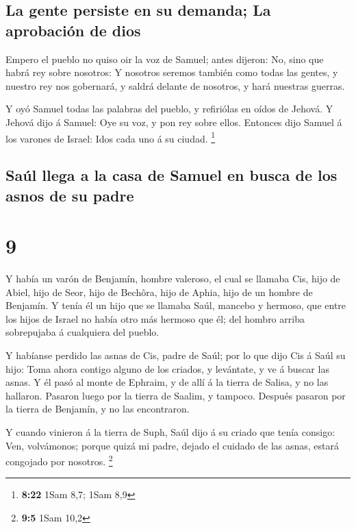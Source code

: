 \hypertarget{la-gente-persiste-en-su-demanda-la-aprobaciuxf3n-de-dios}{%
\subsection{La gente persiste en su demanda; La aprobación de
dios}\label{la-gente-persiste-en-su-demanda-la-aprobaciuxf3n-de-dios}}

 Empero el pueblo no quiso oir la voz de Samuel; antes
dijeron: No, sino que habrá rey sobre nosotros:  Y
nosotros seremos también como todas las gentes, y nuestro rey nos
gobernará, y saldrá delante de nosotros, y hará nuestras guerras.

 Y oyó Samuel todas las palabras del pueblo, y refiriólas
en oídos de Jehová.  Y Jehová dijo á Samuel: Oye su voz,
y pon rey sobre ellos. Entonces dijo Samuel á los varones de Israel:
Idos cada uno á su ciudad. \footnote{\textbf{8:22} 1Sam 8,7; 1Sam 8,9}

\hypertarget{sauxfal-llega-a-la-casa-de-samuel-en-busca-de-los-asnos-de-su-padre}{%
\subsection{Saúl llega a la casa de Samuel en busca de los asnos de su
padre}\label{sauxfal-llega-a-la-casa-de-samuel-en-busca-de-los-asnos-de-su-padre}}

\hypertarget{section-8}{%
\section{9}\label{section-8}}

 Y había un varón de Benjamín, hombre valeroso, el cual se
llamaba Cis, hijo de Abiel, hijo de Seor, hijo de Bechôra, hijo de
Aphia, hijo de un hombre de Benjamín.  Y tenía él un hijo
que se llamaba Saúl, mancebo y hermoso, que entre los hijos de Israel no
había otro más hermoso que él; del hombro arriba sobrepujaba á
cualquiera del pueblo.

 Y habíanse perdido las asnas de Cis, padre de Saúl; por
lo que dijo Cis á Saúl su hijo: Toma ahora contigo alguno de los
criados, y levántate, y ve á buscar las asnas.  Y él pasó
al monte de Ephraim, y de allí á la tierra de Salisa, y no las hallaron.
Pasaron luego por la tierra de Saalim, y tampoco. Después pasaron por la
tierra de Benjamín, y no las encontraron.

 Y cuando vinieron á la tierra de Suph, Saúl dijo á su
criado que tenía consigo: Ven, volvámonos; porque quizá mi padre, dejado
el cuidado de las asnas, estará congojado por nosotros. \footnote{\textbf{9:5}
  1Sam 10,2}

